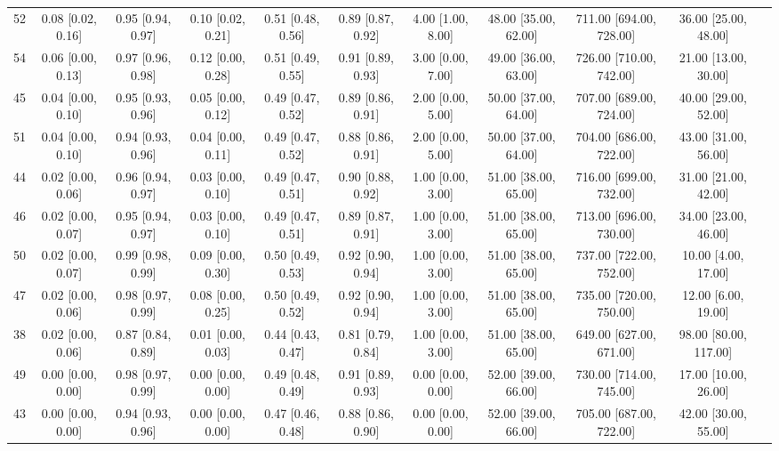 \documentclass[8pt]{article}
\begin{document}
\begin{center}
\begin{footnotesize}
\begin{longtable}{|ccccccccccc|}
 52 &  0.08 [0.02, 0.16] &  0.95 [0.94, 0.97] &  0.10 [0.02, 0.21] &  0.51 [0.48, 0.56] &  0.89 [0.87, 0.92] &     4.00 [1.00, 8.00] &  48.00 [35.00, 62.00] &  711.00 [694.00, 728.00] &     36.00 [25.00, 48.00] \\
 54 &  0.06 [0.00, 0.13] &  0.97 [0.96, 0.98] &  0.12 [0.00, 0.28] &  0.51 [0.49, 0.55] &  0.91 [0.89, 0.93] &     3.00 [0.00, 7.00] &  49.00 [36.00, 63.00] &  726.00 [710.00, 742.00] &     21.00 [13.00, 30.00] \\
 45 &  0.04 [0.00, 0.10] &  0.95 [0.93, 0.96] &  0.05 [0.00, 0.12] &  0.49 [0.47, 0.52] &  0.89 [0.86, 0.91] &     2.00 [0.00, 5.00] &  50.00 [37.00, 64.00] &  707.00 [689.00, 724.00] &     40.00 [29.00, 52.00] \\
 51 &  0.04 [0.00, 0.10] &  0.94 [0.93, 0.96] &  0.04 [0.00, 0.11] &  0.49 [0.47, 0.52] &  0.88 [0.86, 0.91] &     2.00 [0.00, 5.00] &  50.00 [37.00, 64.00] &  704.00 [686.00, 722.00] &     43.00 [31.00, 56.00] \\
 44 &  0.02 [0.00, 0.06] &  0.96 [0.94, 0.97] &  0.03 [0.00, 0.10] &  0.49 [0.47, 0.51] &  0.90 [0.88, 0.92] &     1.00 [0.00, 3.00] &  51.00 [38.00, 65.00] &  716.00 [699.00, 732.00] &     31.00 [21.00, 42.00] \\
 46 &  0.02 [0.00, 0.07] &  0.95 [0.94, 0.97] &  0.03 [0.00, 0.10] &  0.49 [0.47, 0.51] &  0.89 [0.87, 0.91] &     1.00 [0.00, 3.00] &  51.00 [38.00, 65.00] &  713.00 [696.00, 730.00] &     34.00 [23.00, 46.00] \\
 50 &  0.02 [0.00, 0.07] &  0.99 [0.98, 0.99] &  0.09 [0.00, 0.30] &  0.50 [0.49, 0.53] &  0.92 [0.90, 0.94] &     1.00 [0.00, 3.00] &  51.00 [38.00, 65.00] &  737.00 [722.00, 752.00] &      10.00 [4.00, 17.00] \\
 47 &  0.02 [0.00, 0.06] &  0.98 [0.97, 0.99] &  0.08 [0.00, 0.25] &  0.50 [0.49, 0.52] &  0.92 [0.90, 0.94] &     1.00 [0.00, 3.00] &  51.00 [38.00, 65.00] &  735.00 [720.00, 750.00] &      12.00 [6.00, 19.00] \\
 38 &  0.02 [0.00, 0.06] &  0.87 [0.84, 0.89] &  0.01 [0.00, 0.03] &  0.44 [0.43, 0.47] &  0.81 [0.79, 0.84] &     1.00 [0.00, 3.00] &  51.00 [38.00, 65.00] &  649.00 [627.00, 671.00] &    98.00 [80.00, 117.00] \\
 49 &  0.00 [0.00, 0.00] &  0.98 [0.97, 0.99] &  0.00 [0.00, 0.00] &  0.49 [0.48, 0.49] &  0.91 [0.89, 0.93] &     0.00 [0.00, 0.00] &  52.00 [39.00, 66.00] &  730.00 [714.00, 745.00] &     17.00 [10.00, 26.00] \\
 43 &  0.00 [0.00, 0.00] &  0.94 [0.93, 0.96] &  0.00 [0.00, 0.00] &  0.47 [0.46, 0.48] &  0.88 [0.86, 0.90] &     0.00 [0.00, 0.00] &  52.00 [39.00, 66.00] &  705.00 [687.00, 722.00] &     42.00 [30.00, 55.00] \\

\end{longtable}
\end{footnotesize}
\end{center}
\end{document}
